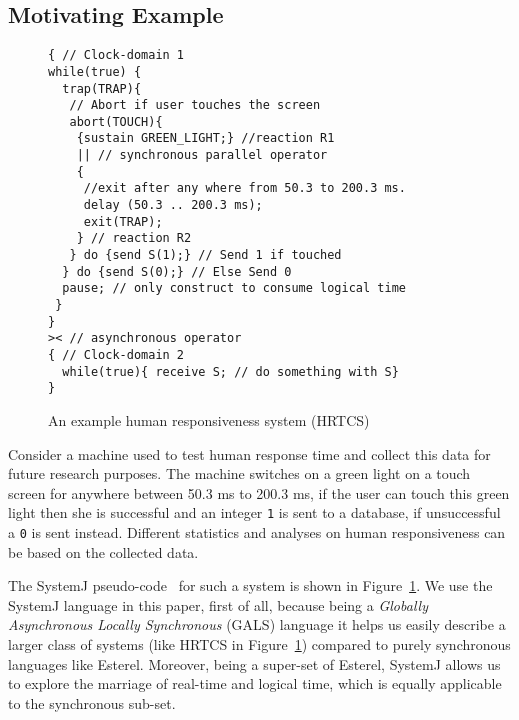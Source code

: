 \subsection{Motivating Example}
\label{sec:motivating-example}

\begin{figure}[t!]
	\vspace{-10pt}
		\begin{lstlisting}[style=sysj,morekeywords={sustain,send,receive,abort,await,emit,present,trap,pause,exit,delay,suspend}]
{ // Clock-domain 1
while(true) {
  trap(TRAP){
   // Abort if user touches the screen
   abort(TOUCH){
    {sustain GREEN_LIGHT;} //reaction R1
    || // synchronous parallel operator
    {
     //exit after any where from 50.3 to 200.3 ms.
     delay (50.3 .. 200.3 ms); 
     exit(TRAP); 
    } // reaction R2
   } do {send S(1);} // Send 1 if touched 
  } do {send S(0);} // Else Send 0
  pause; // only construct to consume logical time
 }
}
>< // asynchronous operator
{ // Clock-domain 2
  while(true){ receive S; // do something with S}
}
\end{lstlisting}
\caption{An example human responsiveness system (HRTCS)}
\label{fig:1}
\end{figure}

Consider a machine used to test human response time and collect this
data for future research purposes. The machine switches on a green light
on a touch screen for anywhere between 50.3 ms to 200.3 ms, if the user
can touch this green light then she is successful and an integer
\texttt{1} is sent to a database, if unsuccessful a \texttt{0} is sent
instead. Different statistics and analyses on human responsiveness can
be based on the collected data.

The SystemJ pseudo-code~\cite{amal10} for such a system is shown in
Figure~\ref{fig:1}. We use the SystemJ language in this paper, first of
all, because being a \textit{Globally Asynchronous Locally Synchronous}
(GALS) language it helps us easily describe a larger class of systems
(like HRTCS in Figure~\ref{fig:1}) compared to purely synchronous
languages like Esterel. Moreover, being a super-set of Esterel, SystemJ
allows us to explore the marriage of real-time and logical time, which
is equally applicable to the synchronous sub-set.

